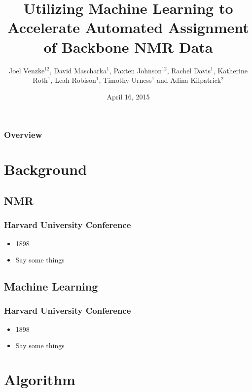 \documentclass{beamer}
\title[NMR Assignment with Machine Learning]{Utilizing Machine Learning to Accelerate Automated
Assignment of Backbone NMR Data} %
\author[J. Venzke \\D. Mascharka \\P. Johnson \\R. Davis \\K. Roth\\ L. Robison\\ T. Urness \\A. Kilpatrick]{Joel Venzke$^{12}$, David Mascharka$^{1}$, Paxten Johnson$^{12}$, Rachel Davis$^{1}$, Katherine Roth$^{1}$,  Leah Robison$^{1}$, Timothy Urness$^{1}$ and Adina Kilpatrick$^{2}$} %
\institute[Drake University] %
{
$^1$Department of Mathematics and Computer Science\\
$^2$Department of Physics and Astronomy\\
Drake University\\

\medskip
\textit{joel.venzke@drake.edu} %
}
\date{April 16, 2015} %
\begin{document}
\begin{frame}
\titlepage %
\end{frame}

\begin{frame}
\frametitle{Overview} %
\tableofcontents 
\end{frame}

\section{Background}
\subsection{NMR} 
\begin{frame}
	\frametitle{Harvard University Conference}
	\begin{itemize}
		\item 1898
		\item Say some things
	\end{itemize}
\end{frame}

\subsection{Machine Learning} 
\begin{frame}
	\frametitle{Harvard University Conference}
	\begin{itemize}
		\item 1898
		\item Say some things
	\end{itemize}
\end{frame}

\section{Algorithm}
\end{document}
